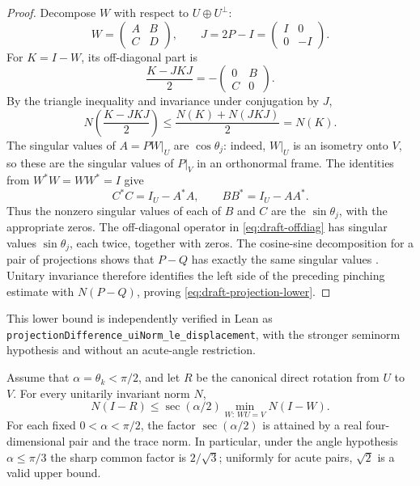 \begin{proof}
Decompose $W$ with respect to $U\oplus U^\perp$:
\[
 W=\begin{pmatrix}A&B\\ C&D\end{pmatrix},
 \qquad J=2P-I=\begin{pmatrix}I&0\\0&-I\end{pmatrix}.
\]
For $K=I-W$, its off-diagonal part is
\begin{equation}
 \frac{K-JKJ}{2}=-\begin{pmatrix}0&B\\C&0\end{pmatrix}.
 \label{eq:draft-offdiag}
\end{equation}
By the triangle inequality and invariance under conjugation by $J$,
\[
 N\!\left(\frac{K-JKJ}{2}\right)
 \leq\frac{N(K)+N(JKJ)}2=N(K).
\]
The singular values of $A=P W|_U$ are $\cos\theta_j$: indeed,
$W|_U$ is an isometry onto $V$, so these are the singular values of
$P|_V$ in an orthonormal frame. The identities from $W^*W=WW^*=I$ give
\[
 C^*C=I_U-A^*A,
 \qquad BB^*=I_U-AA^*.
\]
Thus the nonzero singular values of each of $B$ and $C$ are the
$\sin\theta_j$, with the appropriate zeros. The off-diagonal operator in
\cref{eq:draft-offdiag} has singular values $\sin\theta_j$, each twice,
together with zeros. The cosine-sine decomposition for a pair of projections
shows that $P-Q$ has exactly the same singular values
\citep{stewart1990matrix,bhatia1997matrix}.
Unitary invariance therefore identifies the left side of the preceding
pinching estimate with $N(P-Q)$, proving \cref{eq:draft-projection-lower}.
\end{proof}

This lower bound is independently verified in Lean as
\texttt{projectionDifference\_uiNorm\_le\_displacement}, with the stronger
seminorm hypothesis and without an acute-angle restriction.

\begin{theorem}
\label{thm:draft-sharp-displacement}
Assume that $\alpha=\theta_k<\pi/2$, and let $R$ be the canonical direct
rotation from $U$ to $V$. For every unitarily invariant norm $N$,
\begin{equation}
 N(I-R)\leq\sec(\alpha/2)
 \min_{W:\,WU=V}N(I-W).
 \label{eq:draft-sharp-displacement}
\end{equation}
For each fixed $0<\alpha<\pi/2$, the factor $\sec(\alpha/2)$ is
attained by a real four-dimensional pair and the trace norm. In particular,
under the angle hypothesis $\alpha\leq\pi/3$ the sharp common factor is
$2/\sqrt3$; uniformly for acute pairs, $\sqrt2$ is a valid upper bound.
\end{theorem}

